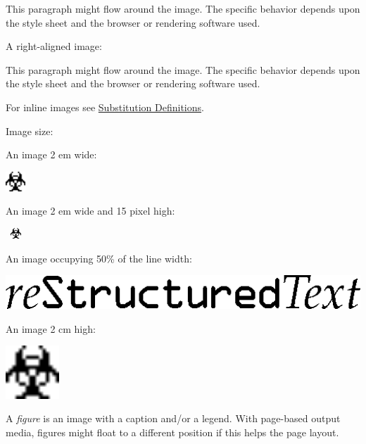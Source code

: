 \documentclass[a4paper]{memoir}
\begin{document}
This paragraph might flow around the image.
The specific behavior depends upon the style sheet and
the browser or rendering software used.

A right-aligned image:


This paragraph might flow around the image.
The specific behavior depends upon the style sheet and
the browser or rendering software used.

For inline images see \hyperref[substitution-definitions]{Substitution Definitions}.

Image size:

An image 2 em wide:

\includegraphics[width=2em]{../../../docs/user/rst/images/biohazard.png}

An image 2 em wide and 15 pixel high:

\includegraphics[height=15px,width=2em]{../../../docs/user/rst/images/biohazard.png}

An image occupying 50\% of the line width:

\includegraphics[width=0.500\linewidth]{../../../docs/user/rst/images/title.png}

An image 2 cm high:

\includegraphics[height=2cm]{../../../docs/user/rst/images/biohazard.png}

A \emph{figure} is an image with a caption and/or a legend.  With page-based output
media, figures might float to a different position if this helps the page
layout.
\end{document}
